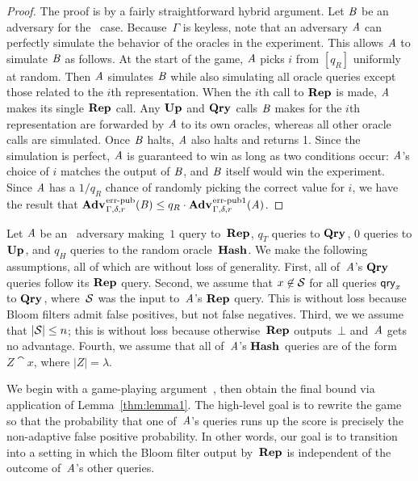 \begin{proof}
The proof is by a fairly straightforward hybrid argument. Let $\mathit{B}$ be an adversary
for the \errep\ case. Because~$\Gamma$ is keyless, note that an  adversary
$\mathit{A}$ can perfectly simulate the behavior of the oracles in the experiment. This
allows $\mathit{A}$ to simulate $\mathit{B}$ as follows. At the start of the game, $\mathit{A}$ picks
$i$ from $[q_R]$ uniformly at random. Then $\mathit{A}$ simulates $\mathit{B}$ while also
simulating all oracle queries except those related to the $i$th representation.
When the $i$th call to $\textup{\textbf{Rep}}\hspace{0.5pt}$ is made, $\mathit{A}$ makes its single $\textup{\textbf{Rep}}\hspace{0.5pt}$ call.
Any $\textup{\textbf{Up}}\hspace{0.5pt}$ and $\textup{\textbf{Qry}}\hspace{0.5pt}$ calls $\mathit{B}$ makes for the $i$th representation are forwarded
by $\mathit{A}$ to its own oracles, whereas all other oracle calls are simulated.
Once $\mathit{B}$ halts, $\mathit{A}$ also halts and returns 1. Since the simulation is
perfect, $\mathit{A}$ is guaranteed to win as long as two conditions occur: $\mathit{A}$'s
choice of $i$ matches the output of $\mathit{B}$, and $\mathit{B}$ itself would win the experiment.
Since $\mathit{A}$ has a $1/q_R$ chance of randomly picking the correct value for $i$,
we have the result that
$\Adv{\errep}_{\Gamma,\delta,r}(\advB) \leq q_R \cdot \Adv{\errep1}_{\Gamma,\delta,r}(\advA)$.
\end{proof}

Let $\mathit{A}$ be an \errep\ adversary making~$1$ query to~$\textup{\textbf{Rep}}\hspace{0.5pt}$, $q_T$ queries
to $\textup{\textbf{Qry}}\hspace{0.5pt}$, $0$ queries to $\textup{\textbf{Up}}\hspace{0.5pt}$, and $q_H$ queries to the random
oracle~$\textup{\textbf{Hash}}\hspace{0.5pt}$.
%
We make the following assumptions, all of which are without loss of generality.
%
First, all of~$\mathit{A}$'s $\textup{\textbf{Qry}}\hspace{0.5pt}$ queries follow its $\textup{\textbf{Rep}}\hspace{0.5pt}$ query.
%
Second, we assume that $x\not\in\mathcal{S}$ for all queries $\mathsf{qry}_x$ to $\textup{\textbf{Qry}}\hspace{0.5pt}$,
where~$\mathcal{S}$ was the input to~$\mathit{A}$'s $\textup{\textbf{Rep}}\hspace{0.5pt}$ query. This is without loss
because Bloom filters admit false positives, but not false negatives.
%
Third, we we assume that $|\mathcal{S}| \leq n$; this is without loss because
otherwise~$\textup{\textbf{Rep}}\hspace{0.5pt}$ outputs~$\bot$ and~$\mathit{A}$ gets no advantage.
%
Fourth, we assume that all of~$\mathit{A}$'s $\textup{\textbf{Hash}}\hspace{0.5pt}$ queries are of the form $Z\cat
x$, where $|Z| = \lambda$.

We begin with a game-playing argument~\cite{bellare2006triple}, then obtain the
final bound via application of Lemma~\ref{thm:lemma1}.
%
The high-level goal is to rewrite the game so that the probability that one
of~$\mathit{A}$'s queries runs up the score is precisely the non-adaptive false
positive probability.
%
In other words, our goal is to transition into a setting in which the Bloom
filter output by~$\textup{\textbf{Rep}}\hspace{0.5pt}$ is independent of the outcome of~$\mathit{A}$'s other
queries.


